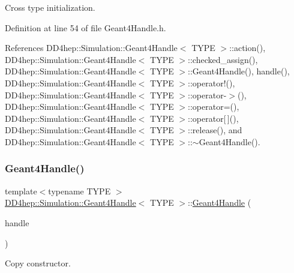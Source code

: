 Cross type initialization. 



Definition at line 54 of file Geant4\+Handle.\+h.



References D\+D4hep\+::\+Simulation\+::\+Geant4\+Handle$<$ T\+Y\+P\+E $>$\+::action(), D\+D4hep\+::\+Simulation\+::\+Geant4\+Handle$<$ T\+Y\+P\+E $>$\+::checked\+\_\+assign(), D\+D4hep\+::\+Simulation\+::\+Geant4\+Handle$<$ T\+Y\+P\+E $>$\+::\+Geant4\+Handle(), handle(), D\+D4hep\+::\+Simulation\+::\+Geant4\+Handle$<$ T\+Y\+P\+E $>$\+::operator!(), D\+D4hep\+::\+Simulation\+::\+Geant4\+Handle$<$ T\+Y\+P\+E $>$\+::operator-\/$>$(), D\+D4hep\+::\+Simulation\+::\+Geant4\+Handle$<$ T\+Y\+P\+E $>$\+::operator=(), D\+D4hep\+::\+Simulation\+::\+Geant4\+Handle$<$ T\+Y\+P\+E $>$\+::operator\mbox{[}$\,$\mbox{]}(), D\+D4hep\+::\+Simulation\+::\+Geant4\+Handle$<$ T\+Y\+P\+E $>$\+::release(), and D\+D4hep\+::\+Simulation\+::\+Geant4\+Handle$<$ T\+Y\+P\+E $>$\+::$\sim$\+Geant4\+Handle().

\hypertarget{class_d_d4hep_1_1_simulation_1_1_geant4_handle_a285188049a0dfb7e4129c2ba4556c105}{}\label{class_d_d4hep_1_1_simulation_1_1_geant4_handle_a285188049a0dfb7e4129c2ba4556c105} 
\subsubsection{\texorpdfstring{Geant4\+Handle()}{Geant4Handle()}\hspace{0.1cm}{\footnotesize\ttfamily [4/20]}}
{\footnotesize\ttfamily template$<$typename T\+Y\+PE $>$ \\
\hyperlink{class_d_d4hep_1_1_simulation_1_1_geant4_handle}{D\+D4hep\+::\+Simulation\+::\+Geant4\+Handle}$<$ T\+Y\+PE $>$\+::\hyperlink{class_d_d4hep_1_1_simulation_1_1_geant4_handle}{Geant4\+Handle} (\begin{DoxyParamCaption}\item[{const \hyperlink{class_d_d4hep_1_1_simulation_1_1_geant4_handle}{Geant4\+Handle}$<$ T\+Y\+PE $>$ \&}]{handle }\end{DoxyParamCaption})}



Copy constructor. 



